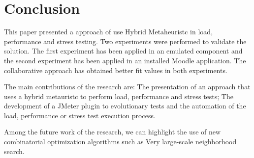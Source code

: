 \section{Conclusion}

This paper presented a approach of use Hybrid Metaheuristc in load, performance and stress testing. Two experiments were performed to validate the solution. The first experiment has been applied in an emulated component and the second experiment has been applied in an installed Moodle application.  The collaborative approach has obtained better fit values in both experiments. 

The main contributions of the research are: The presentation of an approach that uses a hybrid metauristc to perform load, performance and stress tests;  The development of a JMeter plugin  to evolutionary tests and  the automation of the  load, performance or stress test execution process.

Among the future work of the research, we can highlight the use of new combinatorial optimization algorithms such as Very large-scale neighborhood search.